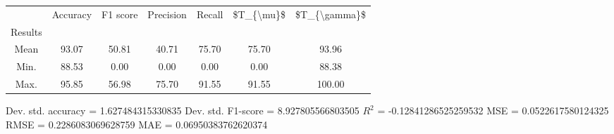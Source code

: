 \begin{tabular}{|c|c|c|c|c|c|c|}
\toprule
{} &  Accuracy &  F1 score &  Precision &  Recall &  \$T\_\{\textbackslash mu\}\$ &  \$T\_\{\textbackslash gamma\}\$ \\
Results &           &           &            &         &            &               \\
\hline
Mean    &     93.07 &     50.81 &      40.71 &   75.70 &      75.70 &         93.96 \\
Min.    &     88.53 &      0.00 &       0.00 &    0.00 &       0.00 &         88.38 \\
Max.    &     95.85 &     56.98 &      75.70 &   91.55 &      91.55 &        100.00 \\
\bottomrule
\end{tabular}

 Dev. std. accuracy = 1.627484315330835
 Dev. std. F1-score = 8.927805566803505
 $R^2$ = -0.12841286525259532
 MSE = 0.0522617580124325
 RMSE = 0.2286083069628759
 MAE = 0.06950383762620374